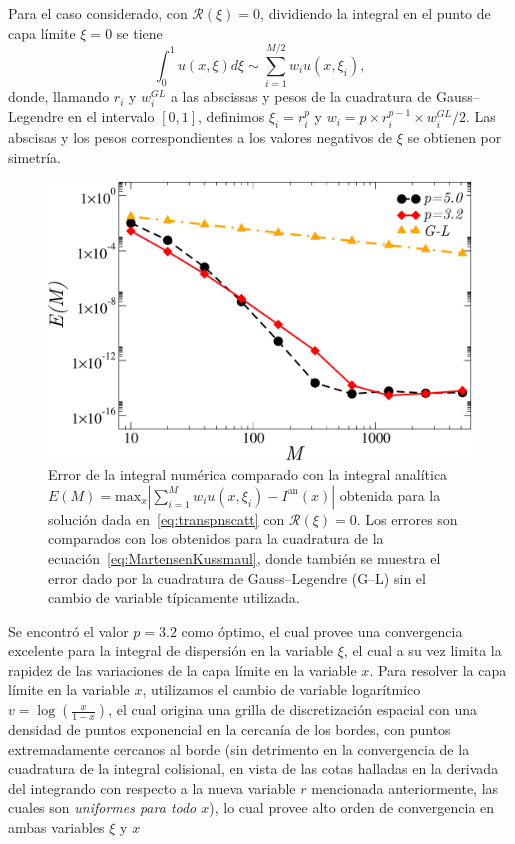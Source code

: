 Para el caso considerado, con $\mathcal{R}(\xi)=0$, 
dividiendo la integral en el punto de capa límite $\xi=0$ se tiene 
\begin{equation}
\int_{0}^{1} u(x,\xi) d\xi \sim \sum_{i=1}^{M/2} w_i u(x,\xi_i),
\label{eq:MartensenKussmaul}
\end{equation}
donde, llamando $r_i$ y $w_i^{GL}$ a las abscissas y pesos de la 
cuadratura de Gauss--Legendre en el intervalo $[0,1]$, 
definimos $\xi_i=r_i^p$ y $w_i= p \times r_i^{p-1} \times w_i^{GL}/2$. 
Las abscisas y los pesos correspondientes a los valores negativos 
de $\xi$ se obtienen por simetría. 
\begin{figure}[h!]
\centering
  \includegraphics[width=0.5\linewidth]{figuras/quads.pdf}
  \caption{Error de la integral numérica comparado con la integral 
  analítica $E(M)=\text{max}_x |\sum_{i=1}^M w_i u(x,\xi_i)-I^{\text{an}}(x)|$
  obtenida para la solución dada en~\eqref{eq:transpnscatt} con $\mathcal{R}(\xi)=0$. 
  Los errores son comparados con los obtenidos para la cuadratura 
  de la ecuación~\eqref{eq:MartensenKussmaul}, donde 
  también se muestra el error dado por la cuadratura de  Gauss--Legendre
    (G--L) sin el cambio de variable típicamente utilizada.}
 \label{fig:intconvs}
\end{figure}
Se encontró el valor $p=3.2$ como óptimo, el cual 
provee una convergencia excelente para la integral 
de dispersión en la variable $\xi$, el cual a su vez limita la rapidez 
de las variaciones de la capa límite en la variable $x$. 
Para resolver la capa límite en la variable $x$, utilizamos 
el cambio de variable logarítmico $v=\log(\frac{x}{1-x})$, 
el cual origina una grilla de discretización espacial con una 
densidad de puntos exponencial en la cercanía de los bordes, 
con puntos extremadamente cercanos al borde (sin detrimento 
en la convergencia de la cuadratura de la integral colisional, 
en vista de las cotas halladas en la derivada del 
integrando con respecto a la nueva variable $r$ mencionada 
anteriormente, las cuales son {\em uniformes para todo $x$}), 
lo cual provee alto orden de convergencia en ambas variables $\xi$ y $x$

